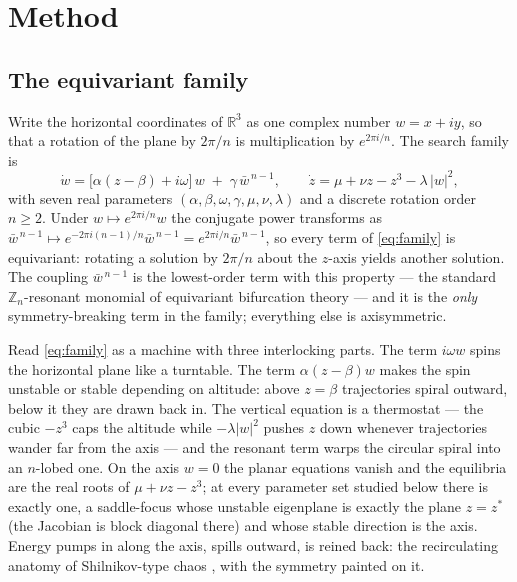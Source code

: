 \documentclass[11pt]{article}
\newcommand{\conj}[1]{\bar{#1}}
\begin{document}
\section{Method}\label{sec:method}

\subsection{The equivariant family}\label{sec:family}

Write the horizontal coordinates of $\mathbb{R}^3$ as one complex number
$w = x + iy$, so that a rotation of the plane by $2\pi/n$ is multiplication
by $e^{2\pi i/n}$. The search family is
\begin{equation}\label{eq:family}
  \dot w = \bigl[\alpha(z-\beta) + i\omega\bigr]\,w
           \;+\; \gamma\,\conj{w}^{\,n-1},
  \qquad
  \dot z = \mu + \nu z - z^{3} - \lambda\,|w|^{2},
\end{equation}
with seven real parameters
$(\alpha,\beta,\omega,\gamma,\mu,\nu,\lambda)$ and a discrete rotation
order $n \ge 2$. Under $w \mapsto e^{2\pi i/n} w$ the conjugate power
transforms as $\conj{w}^{\,n-1} \mapsto e^{-2\pi i (n-1)/n}\conj{w}^{\,n-1}
= e^{2\pi i/n}\conj{w}^{\,n-1}$, so every term of \eqref{eq:family} is
equivariant: rotating a solution by $2\pi/n$ about the $z$-axis yields
another solution. The coupling $\conj{w}^{\,n-1}$ is the lowest-order term
with this property --- the standard $\mathbb{Z}_n$-resonant monomial of
equivariant bifurcation theory \citep{golubitskyStewartSchaeffer1988} ---
and it is the \emph{only} symmetry-breaking term in the family; everything
else is axisymmetric.

Read \eqref{eq:family} as a machine with three interlocking parts. The
term $i\omega w$ spins the horizontal plane like a turntable. The term
$\alpha(z-\beta)w$ makes the spin unstable or stable depending on
altitude: above $z=\beta$ trajectories spiral outward, below it they are
drawn back in. The vertical equation is a thermostat --- the cubic $-z^3$
caps the altitude while $-\lambda|w|^2$ pushes $z$ down whenever
trajectories wander far from the axis --- and the resonant term warps the
circular spiral into an $n$-lobed one. On the axis $w=0$ the planar
equations vanish and the equilibria are the real roots of
$\mu + \nu z - z^3$; at every parameter set studied below there is exactly
one, a saddle-focus whose unstable eigenplane is exactly the plane
$z = z^\ast$ (the Jacobian is block diagonal there) and whose stable
direction is the axis. Energy pumps in along the axis, spills outward, is
reined back: the recirculating anatomy of Shilnikov-type chaos
\citep{shilnikov1965}, with the symmetry painted on it.
\end{document}
